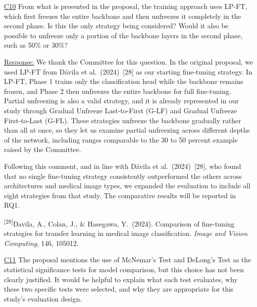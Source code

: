 \documentclass[12pt,a4paper]{article}
\newcommand{\cid}[1]{{\color{cidred}\underline{#1}}}
\newcommand{\mref}[1]{%
  \marginnote{%
    \color{respblue}\scriptsize
    \rule[-0.3ex]{0.6pt}{1.4ex}\hspace{4pt}%
    \parbox[t]{2.4cm}{\raggedright #1}%
  }%
}
\newenvironment{response}{%
  \par\color{respblue}%
}{\par}
\begin{document}
\cid{C10} From what is presented in the proposal, the training approach uses LP-FT, which first freezes the entire backbone and then unfreezes it completely in the second phase. Is this the only strategy being considered? Would it also be possible to unfreeze only a portion of the backbone layers in the second phase, such as 50\% or 30\%?

\mref{\S~1.3\\Research\\Questions\\[4pt]\S~3.6.3.3\\Fine-Tuning\\Strategies\\[4pt]\S~3.7\\Evaluation\\Plan}
\begin{response}
\underline{Response:} We thank the Committee for this question. In the original proposal, we used LP-FT from Dávila et al.\ (2024)~[28] as our starting fine-tuning strategy. In LP-FT, Phase 1 trains only the classification head while the backbone remains frozen, and Phase 2 then unfreezes the entire backbone for full fine-tuning. Partial unfreezing is also a valid strategy, and it is already represented in our study through Gradual Unfreeze Last-to-First (G-LF) and Gradual Unfreeze First-to-Last (G-FL). These strategies unfreeze the backbone gradually rather than all at once, so they let us examine partial unfreezing across different depths of the network, including ranges comparable to the 30 to 50 percent example raised by the Committee.

Following this comment, and in line with Dávila et al.\ (2024)~[28], who found that no single fine-tuning strategy consistently outperformed the others across architectures and medical image types, we expanded the evaluation to include all eight strategies from that study. The comparative results will be reported in RQ1.
\end{response}

{\color{respblue}\raggedright\small\textsuperscript{[28]}Davila, A., Colan, J., \& Hasegawa, Y.\ (2024). Comparison of fine-tuning strategies for transfer learning in medical image classification. \textit{Image and Vision Computing}, 146, 105012.\par}

\cid{C11} The proposal mentions the use of McNemar's Test and DeLong's Test as the statistical significance tests for model comparison, but this choice has not been clearly justified. It would be helpful to explain what each test evaluates, why these two specific tests were selected, and why they are appropriate for this study's evaluation design.
\end{document}
